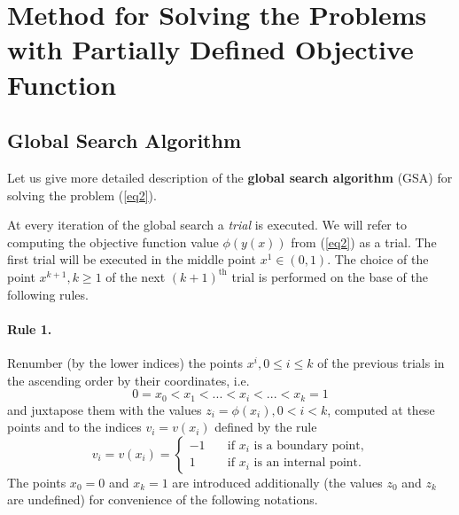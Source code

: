 \documentclass[runningheads]{llncs}
\begin{document}
\section{Method for Solving the Problems with Partially Defined Objective Function}

\subsection{Global Search Algorithm}


Let us give more detailed description of the \textbf{global search algorithm} (GSA) for solving the problem (\ref{eq2}).

At every iteration of the global search a \textit{trial} is executed. We will refer to computing the objective function value  $\phi (y(x))$ from (\ref{eq2}) as a trial. The first trial will be executed in the middle point $x^1 \in (0,1)$. The choice of the point $x^{k+1}, k \geq 1$ of the next $(k+1)^\text{th}$ trial is performed on the base of the following rules.

\paragraph{Rule 1.} Renumber (by the lower indices) the points $x^i, 0 \leq i \leq k$  of the previous trials in the ascending order by their coordinates, i.e.
\begin{equation}\label{eq5} 
0=x_0 < x_1 < ... < x_i < ... < x_{k}=1
\end{equation}
and juxtapose them with the values $z_i=\phi (x_i), 0 < i < k$, computed at these points and to the indices $v_i=v(x_i)$ defined by the rule
\begin{equation}\label{eq6} 
v_i=v(x_i)=
  \begin{cases}
    -1 & {\quad \text{if } x_i \text{ is a boundary point,}}\\
    1  & {\quad \text{if } x_i \text{ is an internal point.}}
  \end{cases}
\end{equation}
The points $x_0=0$ and $x_{k}=1$ are introduced additionally (the values $z_0$ and $z_{k}$ are undefined) for convenience of the following notations.
\end{document}
